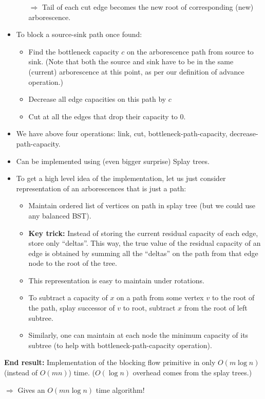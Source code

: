 \documentclass{article}
\begin{document}
\begin{itemize}
\begin{itemize}
$\Rightarrow$ Tail of each cut edge becomes the new root of corresponding (new) arborescence. 
\end{itemize}
\item To block a source-sink path once found:
\begin{itemize}
\item Find the bottleneck capacity $c$ on the arborescence path from source to sink. (Note that both the source and sink have to be in the same (current) arborescence at this point, as per our definition of advance operation.)
\item Decrease all edge capacities on this path by $c$
\item Cut at all the edges that drop their capacity to $0$.
\end{itemize}
\item We have above four operations: link, cut, bottleneck-path-capacity, decrease-path-capacity.
\item Can be implemented using (even bigger surprise) Splay trees. 
\item To get a high level idea of the implementation, let us just consider representation of an arborescences that is just a path:
\begin{itemize}
\item Maintain ordered list of vertices on path in splay tree (but we could use any balanced BST).
\item \textbf{Key trick:} Instead of storing the current residual capacity of each edge, store  only ``deltas''. This way, the true value of the residual capacity of an edge is obtained by summing all the ``deltas'' on the path from that edge node to the root of the tree. 
\item This representation is easy to maintain under rotations.
\item To subtract a capacity of $x$ on a path from some vertex $v$ to the root of the path,  splay successor of $v$ to root, subtract $x$ from the root of left subtree.
\item Similarly, one can maintain at each node the minimum capacity of its subtree (to help with bottleneck-path-capacity operation).
\end{itemize}
\end{itemize}

\textbf{End result:} Implementation of the blocking flow primitive in only  $O(m\log n)$ (instead of $O(mn)$) time. ($O(\log n)$ overhead comes from the splay trees.)

$\Rightarrow$ Gives an $O(mn\log n)$ time algorithm!
\end{document}
